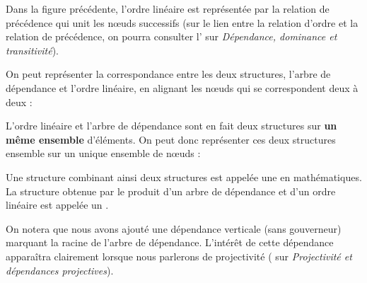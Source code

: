 Dans la figure précédente, l’ordre linéaire est représentée par la relation de précédence qui unit les nœuds successifs (sur le lien entre la relation d’ordre et la relation de précédence, on pourra consulter l’ sur \textit{Dépendance, dominance et transitivité}).

On peut représenter la correspondance entre les deux structures, l’arbre de dépendance et l’ordre linéaire, en alignant les nœuds qui se correspondent deux à deux :

\begin{figure}

\caption{\label{fig:Correspondance entre arbre de dépendance et ordre linéaire}}

\end{figure}

L’ordre linéaire et l’arbre de dépendance sont en fait deux structures sur \textbf{un même ensemble} d’éléments. On peut donc représenter ces deux structures ensemble sur un unique ensemble de nœuds :

\begin{figure}

\caption{\label{fig:Arbre de dépendance ordonné}}

\end{figure}

Une structure combinant ainsi deux structures est appelée une  en mathématiques. La structure obtenue par le produit d’un arbre de dépendance et d’un ordre linéaire est appelée un .

On notera que nous avons ajouté une dépendance verticale (sans gouverneur) marquant la racine de l’arbre de dépendance. L’intérêt de cette dépendance apparaîtra clairement lorsque nous parlerons de projectivité ( sur \textit{Projectivité et dépendances projectives}).

